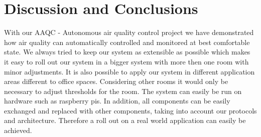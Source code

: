 \section{Discussion and Conclusions}

With our AAQC - Autonomous air quality control project we have
demonstrated how air quality can automatically controlled and monitored
at best comfortable state. We always tried to keep our system as
extensible as possible which makes it easy to roll out our system in a
bigger system with more then one room with minor adjustments. It is also
possible to apply our system in different application areas different to
office spaces. Considering other rooms it would only be necessary to
adjust thresholds for the room. The system can easily be run on hardware
such as raspberry pis. In addition, all components can be easily
exchanged and replaced with other components, taking into account our
protocols and architecture. Therefore a roll out on a real world
application can easily be achieved.